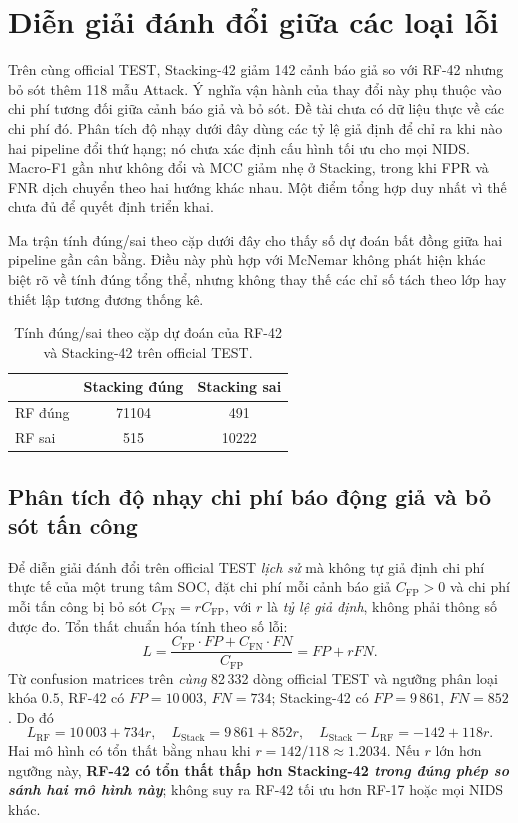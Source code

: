 \section{Diễn giải đánh đổi giữa các loại lỗi}
\label{sec:discussion-error-tradeoff}

Trên cùng official TEST, Stacking-42 giảm 142 cảnh báo giả so với RF-42 nhưng bỏ sót thêm 118 mẫu Attack. Ý nghĩa vận hành của thay đổi này phụ thuộc vào chi phí tương đối giữa cảnh báo giả và bỏ sót. Đề tài chưa có dữ liệu thực về các chi phí đó. Phân tích độ nhạy dưới đây dùng các tỷ lệ giả định để chỉ ra khi nào hai pipeline đổi thứ hạng; nó chưa xác định cấu hình tối ưu cho mọi NIDS. Macro-F1 gần như không đổi và MCC giảm nhẹ ở Stacking, trong khi FPR và FNR dịch chuyển theo hai hướng khác nhau. Một điểm tổng hợp duy nhất vì thế chưa đủ để quyết định triển khai.

Ma trận tính đúng/sai theo cặp dưới đây cho thấy số dự đoán bất đồng giữa hai pipeline gần cân bằng. Điều này phù hợp với McNemar không phát hiện khác biệt rõ về tính đúng tổng thể, nhưng không thay thế các chỉ số tách theo lớp hay thiết lập tương đương thống kê.

\begin{table}[htbp]
\centering
\small
\renewcommand{\arraystretch}{1.3}
\setlength{\tabcolsep}{14pt}
\caption{Tính đúng/sai theo cặp dự đoán của RF-42 và Stacking-42 trên official TEST.}
\label{tab:paired-correctness}
\begin{tabular}{l S[table-format=5.0] S[table-format=5.0]}
\toprule
 & {Stacking đúng} & {Stacking sai}\\
\midrule
RF đúng & 71104 & 491\\
RF sai & 515 & 10222\\
\bottomrule
\end{tabular}
\end{table}

\subsection{Phân tích độ nhạy chi phí báo động giả và bỏ sót tấn công}
\label{sec:v4-fp-fn-cost}
Để diễn giải đánh đổi trên official TEST \emph{lịch sử} mà không tự giả định chi phí thực tế của một trung tâm SOC, đặt chi phí mỗi cảnh báo giả $C_{\mathrm{FP}}>0$ và chi phí mỗi tấn công bị bỏ sót $C_{\mathrm{FN}}=r C_{\mathrm{FP}}$, với $r$ là \emph{tỷ lệ giả định}, không phải thông số được đo. Tổn thất chuẩn hóa tính theo số lỗi:
\[
L=\frac{C_{\mathrm{FP}}\cdot FP+C_{\mathrm{FN}}\cdot FN}{C_{\mathrm{FP}}}=FP+r FN.
\]
Từ confusion matrices trên \emph{cùng} 82\,332 dòng official TEST và ngưỡng phân loại khóa $0.5$, RF-42 có $FP=10\,003$, $FN=734$; Stacking-42 có $FP=9\,861$, $FN=852$. Do đó
\[
L_{\mathrm{RF}}=10\,003+734r,\quad
L_{\mathrm{Stack}}=9\,861+852r,\quad
L_{\mathrm{Stack}}-L_{\mathrm{RF}}=-142+118r.
\]
Hai mô hình có tổn thất bằng nhau khi $r=142/118\approx1.2034$. Nếu $r$ lớn hơn ngưỡng này, \textbf{RF-42 có tổn thất thấp hơn Stacking-42 \emph{trong đúng phép so sánh hai mô hình này}}; không suy ra RF-42 tối ưu hơn RF-17 hoặc mọi NIDS khác.

